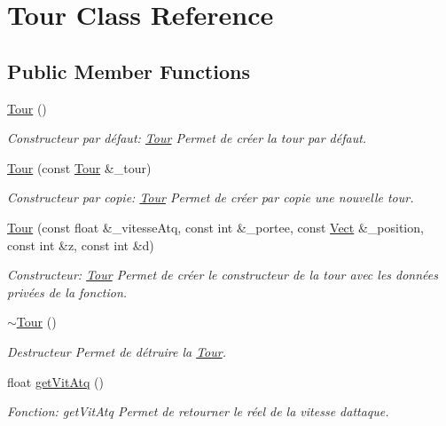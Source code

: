\hypertarget{classTour}{}\section{Tour Class Reference}
\label{classTour}
\subsection*{Public Member Functions}
\begin{DoxyCompactItemize}
\item 
\hyperlink{classTour_a85e0f0e2346d1e42a09a80c1cd6d19c4}{Tour} ()
\begin{DoxyCompactList}\small\item\em Constructeur par défaut\+: \hyperlink{classTour}{Tour} Permet de créer la tour par défaut. \end{DoxyCompactList}\item 
\hyperlink{classTour_a3e25a64c74446192ac71283e08db4e49}{Tour} (const \hyperlink{classTour}{Tour} \&\+\_\+tour)
\begin{DoxyCompactList}\small\item\em Constructeur par copie\+: \hyperlink{classTour}{Tour} Permet de créer par copie une nouvelle tour. \end{DoxyCompactList}\item 
\hyperlink{classTour_abb21d80605aacb220f1ab7ac92119ce4}{Tour} (const float \&\+\_\+vitesse\+Atq, const int \&\+\_\+portee, const \hyperlink{classVect}{Vect} \&\+\_\+position, const int \&z, const int \&d)
\begin{DoxyCompactList}\small\item\em Constructeur\+: \hyperlink{classTour}{Tour} Permet de créer le constructeur de la tour avec les données privées de la fonction. \end{DoxyCompactList}\item 
\mbox{\label{classTour_a6d692d4b1a687bf34f6b38828d86512e}} 
\hyperlink{classTour_a6d692d4b1a687bf34f6b38828d86512e}{$\sim$\+Tour} ()
\begin{DoxyCompactList}\small\item\em Destructeur Permet de détruire la \hyperlink{classTour}{Tour}. \end{DoxyCompactList}\item 
float \hyperlink{classTour_a41fc157f749f571732100fa0daa1ad25}{get\+Vit\+Atq} ()
\begin{DoxyCompactList}\small\item\em Fonction\+: get\+Vit\+Atq Permet de retourner le réel de la vitesse d\textquotesingle{}attaque. \end{DoxyCompactList}\item 

\end{DoxyCompactItemize}
